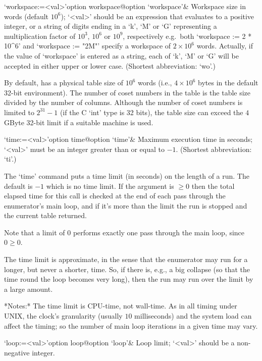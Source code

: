 \beginitems

\>`workspace:=<val>'{option workspace}@{option `workspace'}&
Workspace size in words (default $10^6$);
`<val>' should be an expression that evaluates to a positive  integer,
or a string of digits ending in a  `k',  `M'  or  `G'  representing  a
multiplication  factor  of  $10^3$,  $10^6$  or  $10^9$,  respectively
e.g.~both `workspace := 2 * 10^6' and `workspace :=  "2M"'  specify  a
workspace  of  $2\times10^6$  words.  Actually,  if   the   value   of
`workspace' is entered as a string, each of `k', `M' or  `G'  will  be
accepted in either upper or lower case. (Shortest abbreviation: `wo'.)

By default, {\ACE} has a physical table size of $10^6$ words (i.e., $4
\times 10^6$ bytes in the  default 32-bit environment).  The number of
coset numbers in the table is  the table size divided by the number of
columns.   Although  the  number   of  coset  numbers  is  limited  to
$2^{31}-1$ (if the C `int' type is 32 bits), the table size can exceed
the $4$GByte 32-bit limit if a suitable machine is used.

\>`time:=<val>'{option time}@{option `time'}&
Maximum execution time in seconds; `<val>' must be an integer  greater
than or equal to $-1$. (Shortest abbreviation: `ti'.)

The `time' command  puts a time limit (in seconds) on  the length of a
run. The default is $-1$  which is no  time limit. If the  argument is
$\ge0$ then the total elapsed time for this call is checked at the end
of each pass through the enumerator's main loop, and if it's more than
the limit the run is stopped and the current table returned.

Note that a limit of $0$ performs exactly one pass  through  the  main
loop, since $0 \ge 0$.

The time  limit is approximate, in  the sense that  the enumerator may
run for a longer, but never a shorter, time.  So, if there is, e.g., a
big collapse (so that the time round the loop becomes very long), then
the run may run over the limit by a large amount.

*Notes:*
The time limit is CPU-time, not wall-time.  As  in  all  timing  under
UNIX, the clock's granularity  (usually  $10$  milliseconds)  and  the
system load can  affect  the  timing;  so  the  number  of  main  loop
iterations in a given time may vary.

\>`loop:=<val>'{option loop}@{option `loop'}&
Loop limit; `<val>' should be a non-negative integer.


